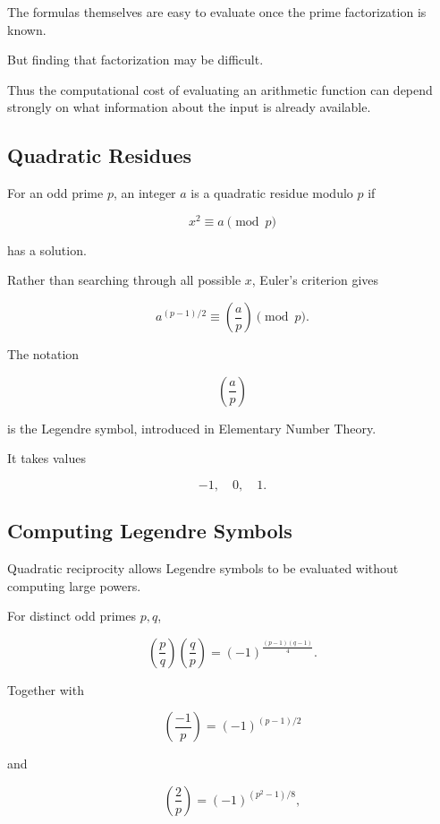 The formulas themselves are easy to evaluate once the prime factorization is
known.

But finding that factorization may be difficult.

Thus the computational cost of evaluating an arithmetic function can depend
strongly on what information about the input is already available.

\subsection{Quadratic Residues}
\label{subsec:computational-quadratic-residues}

For an odd prime \(p\), an integer \(a\) is a quadratic residue modulo \(p\)
if

\[ x^2\equiv a\pmod p \]

has a solution.

Rather than searching through all possible \(x\), Euler's criterion gives

\[ \boxed{a^{(p-1)/2}\equiv\left(\frac ap\right)\pmod p.} \]

The notation

\[ \left(\frac ap\right) \]

is the Legendre symbol, introduced in Elementary Number Theory.

It takes values

\[ -1,\quad0,\quad1. \]

\subsection{Computing Legendre Symbols}
\label{subsec:computing-legendre-symbols}

Quadratic reciprocity allows Legendre symbols to be evaluated without
computing large powers.

For distinct odd primes \(p,q\),

\[
\left(\frac pq\right)
\left(\frac qp\right)
=
(-1)^{\frac{(p-1)(q-1)}4}.
\]

Together with

\[ \left(\frac{-1}{p}\right)=(-1)^{(p-1)/2} \]

and

\[ \left(\frac2p\right)=(-1)^{(p^2-1)/8}, \]

